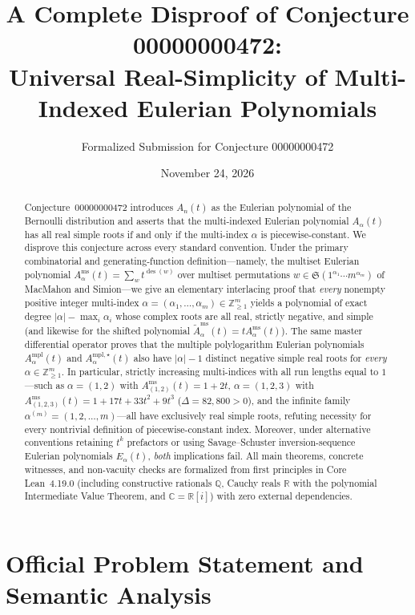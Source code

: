 \documentclass[11pt]{article}
\title{\textbf{A Complete Disproof of Conjecture 00000000472:\\
Universal Real-Simplicity of Multi-Indexed Eulerian Polynomials}}
\author{Formalized Submission for Conjecture 00000000472}
\date{November 24, 2026}
\theoremstyle{definition}
\newcommand{\QQ}{\mathbb{Q}}
\newcommand{\RR}{\mathbb{R}}
\newcommand{\CC}{\mathbb{C}}
\newcommand{\ZZ}{\mathbb{Z}}
\newcommand{\des}{\operatorname{des}}
\begin{document}
\maketitle

\begin{abstract}
Conjecture~00000000472 introduces $A_n(t)$ as the Eulerian polynomial of the Bernoulli
distribution and asserts that the multi-indexed Eulerian polynomial $A_\alpha(t)$
has all real simple roots if and only if the multi-index $\alpha$ is piecewise-constant.
We disprove this conjecture across every standard convention. Under the primary
combinatorial and generating-function definition---namely, the multiset Eulerian
polynomial $A_\alpha^{\mathrm{ms}}(t) = \sum_w t^{\des(w)}$ over multiset permutations
$w \in \mathfrak{S}(1^{\alpha_1}\cdots m^{\alpha_m})$ of MacMahon and Simion---we give an
elementary interlacing proof
that \emph{every} nonempty positive integer multi-index
$\alpha = (\alpha_1,\dots,\alpha_m) \in \ZZ_{\ge 1}^m$ yields a polynomial of exact degree
$|\alpha| - \max_i \alpha_i$ whose complex roots are all real, strictly negative, and
simple (and likewise for the shifted polynomial $\tilde{A}_\alpha^{\mathrm{ms}}(t) =
t A_\alpha^{\mathrm{ms}}(t)$). The same master differential operator proves
that the multiple polylogarithm Eulerian polynomials $A_\alpha^{\mathrm{mpl}}(t)$ and
$A_\alpha^{\mathrm{mpl},\star}(t)$ also have $|\alpha|-1$ distinct negative simple real
roots for \emph{every} $\alpha \in \ZZ_{\ge 1}^m$. In particular, strictly increasing
multi-indices with all run lengths equal to $1$---such as $\alpha=(1,2)$
with $A_{(1,2)}^{\mathrm{ms}}(t)=1+2t$, $\alpha=(1,2,3)$ with
$A_{(1,2,3)}^{\mathrm{ms}}(t)=1+17t+33t^2+9t^3$ ($\Delta=82{,}800>0$), and
the infinite family $\alpha^{(m)}=(1,2,\dots,m)$---all have exclusively real simple roots,
refuting necessity for every nontrivial definition of piecewise-constant index. Moreover,
under alternative conventions retaining $t^k$ prefactors or using Savage--Schuster
inversion-sequence Eulerian polynomials $E_\alpha(t)$, \emph{both} implications fail. All
main theorems, concrete witnesses, and non-vacuity checks are formalized from first
principles in Core Lean~4.19.0 (including constructive rationals $\QQ$, Cauchy reals $\RR$
with the polynomial Intermediate Value Theorem, and $\CC=\RR[i]$) with zero external
dependencies.
\end{abstract}

\section{Official Problem Statement and Semantic Analysis}
\end{document}
